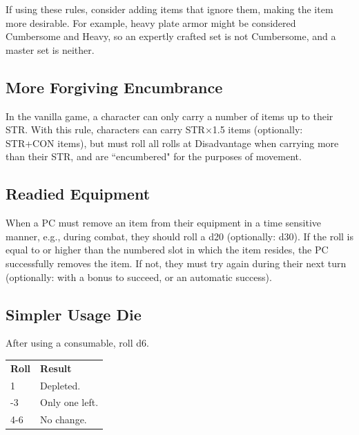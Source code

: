 \documentclass[twoside]{article}
\begin{document}
\bigbreak

If using these rules, consider adding items that ignore them, making the item more desirable. For example, heavy plate armor might be considered Cumbersome and Heavy, so an expertly crafted set is not Cumbersome, and a master set is neither.

\subsection*{More Forgiving Encumbrance}

In the vanilla game, a character can only carry a number of items up to their STR. With this rule, characters can carry STR$\times$1.5 items (optionally: STR+CON items), but must roll all rolls at Disadvantage when carrying more than their STR, and are ``encumbered" for the purposes of movement.

\subsection*{Readied Equipment}

When a PC must remove an item from their equipment in a time sensitive manner, e.g., during combat, they should roll a d20 (optionally: d30). If the roll is equal to or higher than the numbered slot in which the item resides, the PC successfully removes the item. If not, they must try again during their next turn (optionally: with a bonus to succeed, or an automatic success).

\subsection*{Simpler Usage Die}

After using a consumable, roll d6.

\bigbreak

\begin{center}
\noindent\begin{tabular}{>{\centering\arraybackslash}p{}>{\centering\arraybackslash}p{}}
\textbf{Roll}&\textbf{Result}\\
\rowcolor[gray]{0.75}1&Depleted.\\
2-3&Only one left.\\
\rowcolor[gray]{0.75}4-6&No change.\\
\end{tabular}
\end{center}
\end{document}
